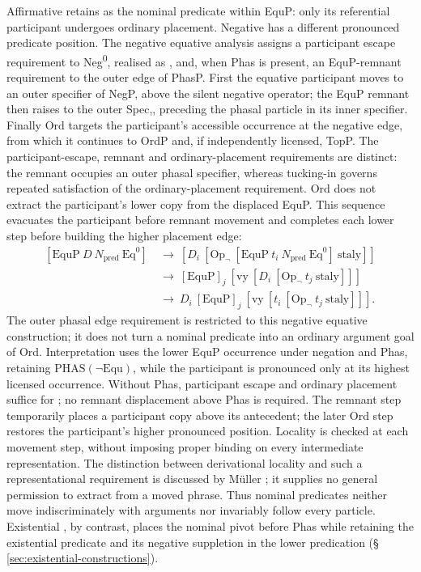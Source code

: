 Affirmative  retains  as the nominal
 predicate within EquP: only its referential participant undergoes ordinary
 placement. Negative  has a different pronounced
 predicate position. The negative equative analysis assigns a participant
 escape requirement to Neg\textsuperscript{0}, realised as ,
 and, when Phas is present, an EquP-remnant requirement to the outer edge of
 PhasP. First the equative participant moves to an outer specifier of NegP,
 above the silent negative operator; the EquP remnant then raises to the outer
 Spec,, preceding the phasal particle in its inner specifier.
 Finally Ord targets the participant's accessible occurrence at the negative
 edge, from which it continues to OrdP and, if independently licensed, TopP.
 The participant-escape, remnant and ordinary-placement requirements are
 distinct: the remnant occupies an outer phasal specifier, whereas tucking-in
 governs repeated satisfaction of the ordinary-placement requirement.
 Ord does not extract the participant's lower copy from the displaced EquP.
 This sequence evacuates the participant before remnant movement and
 completes each lower step before building the higher placement edge:
\[
 \begin{aligned}
 [\mathrm{EquP}\ D\ N_{\mathrm{pred}}\ \mathrm{Eq}^{0}]
 &\ \longrightarrow\ [D_i\ [\mathrm{Op}_{\neg}\ [\mathrm{EquP}\ t_i\ N_{\mathrm{pred}}\ \mathrm{Eq}^{0}]\ \mathrm{staly}]]\\
 &\ \longrightarrow\ [\mathrm{EquP}]_j\ [\mathrm{vy}\ [D_i\ [\mathrm{Op}_{\neg}\ t_j\ \mathrm{staly}]]]\\
 &\ \longrightarrow\ D_i\ [\mathrm{EquP}]_j\ [\mathrm{vy}\ [t_i\ [\mathrm{Op}_{\neg}\ t_j\ \mathrm{staly}]]].
 \end{aligned}
\]
The outer phasal edge requirement is restricted to this negative equative
 construction; it does not turn a nominal predicate into an ordinary argument
 goal of Ord. Interpretation uses the lower EquP occurrence under negation
 and Phas, retaining $\mathrm{PHAS}(\neg\mathrm{Equ})$, while the participant
 is pronounced only at its highest licensed occurrence. Without Phas,
 participant escape and ordinary placement suffice for ;
 no remnant displacement above Phas is required. The remnant step temporarily
 places a participant copy above its antecedent; the later Ord step restores
 the participant's higher pronounced position. Locality is checked at each
 movement step, without imposing proper binding on every intermediate
 representation. The distinction between derivational locality and such a
 representational requirement is discussed by Müller \cite[§1]{mueller2000};
 it supplies no general permission to extract from a moved phrase.
 Thus nominal predicates
 neither move indiscriminately with arguments nor invariably follow every
 particle. Existential , by contrast, places the nominal
 pivot before Phas while retaining the existential predicate and its negative
 suppletion in the lower predication (§\,\ref{sec:existential-constructions}).

